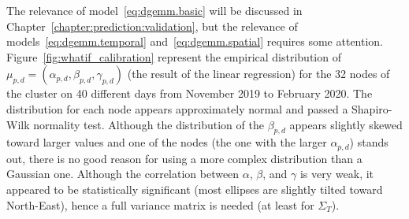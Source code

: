             The relevance of model~\eqref{eq:dgemm.basic} will be discussed in
            Chapter~\ref{chapter:prediction:validation}, but the relevance of models~\eqref{eq:dgemm.temporal}
            and~\eqref{eq:dgemm.spatial} requires some attention.
            Figure~\ref{fig:whatif_calibration} represent the empirical distribution of \(\mu_{p,d} =
            (\alpha_{p,d},\beta_{p,d},\gamma_{p,d})\) (the result of the linear regression) for the 32 nodes of the \dahu
            cluster on 40 different days from November 2019 to February 2020. The distribution for each node appears
            approximately normal and passed a Shapiro-Wilk normality test. Although the distribution of the
            \(\beta_{p,d}\) appears slightly skewed toward larger values and one of the nodes (the one with the larger
            \(\alpha_{p,d}\)) stands out, there is no good reason for using a more complex distribution than a Gaussian
            one. Although the correlation between \(\alpha\), \(\beta\), and \(\gamma\) is very weak, it appeared to be
            statistically significant (most ellipses are slightly tilted toward North-East), hence a full variance
            matrix is needed (at least for \(\Sigma_T\)).

